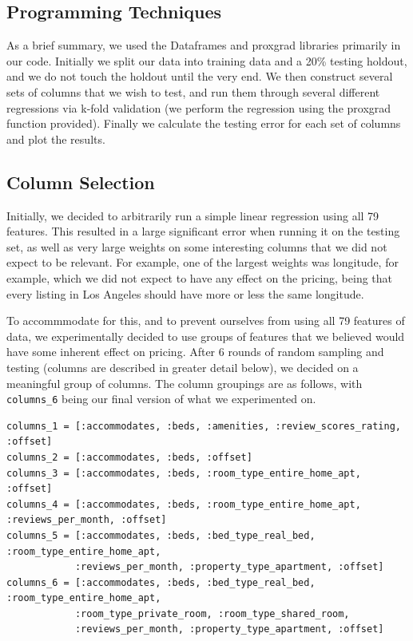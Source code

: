 \documentclass{article}
\begin{document}
\subsection{Programming Techniques}
As a brief summary, we used the Dataframes and proxgrad libraries primarily in our code. Initially we split our data into training data and a 20\% testing holdout, and we do not touch the holdout until the very end. We then construct several sets of columns that we wish to test, and run them through several different regressions via k-fold validation (we perform the regression using the proxgrad function provided). Finally we calculate the testing error for each set of columns and plot the results.

\subsection{Column Selection}
Initially, we decided to arbitrarily run a simple linear regression using all 79 features. This resulted in a large significant error when running it on the testing set, as well as very large weights on some interesting columns that we did not expect to be relevant. For example, one of the largest weights was longitude, for example, which we did not expect to have any effect on the pricing, being that every listing in Los Angeles should have more or less the same longitude.

To accommmodate for this, and to prevent ourselves from using all 79 features of data, we experimentally decided to use groups of features that we believed would have some inherent effect on pricing. After 6 rounds of random sampling and testing (columns are described in greater detail below), we decided on a meaningful group of columns. The column groupings are as follows, with \texttt{columns\_6} being our final version of what we experimented on.

\begin{verbatim}
columns_1 = [:accommodates, :beds, :amenities, :review_scores_rating, :offset]
columns_2 = [:accommodates, :beds, :offset]
columns_3 = [:accommodates, :beds, :room_type_entire_home_apt, :offset]
columns_4 = [:accommodates, :beds, :room_type_entire_home_apt, :reviews_per_month, :offset]
columns_5 = [:accommodates, :beds, :bed_type_real_bed, :room_type_entire_home_apt, 
    		:reviews_per_month, :property_type_apartment, :offset]
columns_6 = [:accommodates, :beds, :bed_type_real_bed, :room_type_entire_home_apt, 
    		:room_type_private_room, :room_type_shared_room, 
    		:reviews_per_month, :property_type_apartment, :offset]
\end{verbatim}
 
\end{document}
